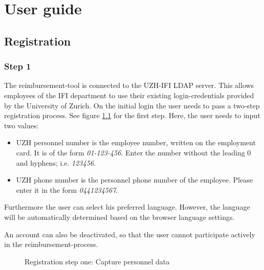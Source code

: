 \chapter{User guide}
\section{Registration}
\label{sec:registration}

\subsection{Step 1}
The reimbursement-tool is connected to the UZH-IFI LDAP server. This allows employees of the IFI department to use their existing login-credentials provided by the University of Zurich.\newline
On the initial login the user needs to pass a two-step registration process. See figure \ref{fig:registration-step01} for the first step. Here, the user needs to input two values:
\begin{itemize}
    \item UZH personnel number is the employee number, written on the employment card. It is of the form \textit{01-123-456}. Enter the number without the leading 0 and hyphens; i.e. \textit{123456}.
    \item UZH phone number is the personnel phone number of the employee. Please enter it in the form \textit{0441234567}.
\end{itemize}\newpage

Furthermore the user can select his preferred language. However, the language will be automatically determined based on the browser language settings.\par
An account can also be deactivated, so that the user cannot participate actively in the reimbursement-process.

\begin{figure}[H]
    \centering
    \caption{Registration step one: Capture personnel data}
    \label{fig:registration-step01}
\end{figure}

